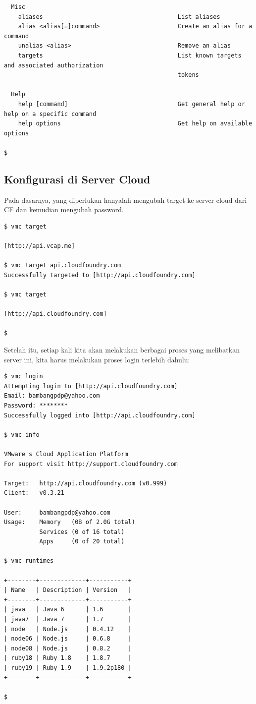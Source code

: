 \begin{lstlisting}
  Misc 
    aliases                                      List aliases 
    alias <alias[=]command>                      Create an alias for a command 
    unalias <alias>                              Remove an alias 
    targets                                      List known targets and associated authorization 
                                                 tokens 

  Help 
    help [command]                               Get general help or help on a specific command 
    help options                                 Get help on available options 

$ 
\end{lstlisting}

\subsection{Konfigurasi di Server Cloud}

Pada dasarnya, yang diperlukan hanyalah mengubah target ke server cloud dari CF dan kemudian mengubah password.

\lstset{language=bash,caption=Mengubah target server}
\begin{lstlisting}
$ vmc target 

[http://api.vcap.me] 

$ vmc target api.cloudfoundry.com 
Successfully targeted to [http://api.cloudfoundry.com] 

$ vmc target 
 
[http://api.cloudfoundry.com] 

$ 
\end{lstlisting}

Setelah itu, setiap kali kita akan melakukan berbagai proses yang melibatkan server ini, kita harus melakukan proses login terlebih dahulu:

\lstset{language=bash,caption=Login ke server}
\begin{lstlisting}
$ vmc login 
Attempting login to [http://api.cloudfoundry.com] 
Email: bambangpdp@yahoo.com 
Password: ******** 
Successfully logged into [http://api.cloudfoundry.com] 

$ vmc info 

VMware's Cloud Application Platform 
For support visit http://support.cloudfoundry.com 

Target:   http://api.cloudfoundry.com (v0.999) 
Client:   v0.3.21 

User:     bambangpdp@yahoo.com 
Usage:    Memory   (0B of 2.0G total) 
          Services (0 of 16 total) 
          Apps     (0 of 20 total) 

$ vmc runtimes 

+--------+-------------+-----------+ 
| Name   | Description | Version   | 
+--------+-------------+-----------+ 
| java   | Java 6      | 1.6       | 
| java7  | Java 7      | 1.7       | 
| node   | Node.js     | 0.4.12    | 
| node06 | Node.js     | 0.6.8     | 
| node08 | Node.js     | 0.8.2     | 
| ruby18 | Ruby 1.8    | 1.8.7     | 
| ruby19 | Ruby 1.9    | 1.9.2p180 | 
+--------+-------------+-----------+ 

$ 
\end{lstlisting}

